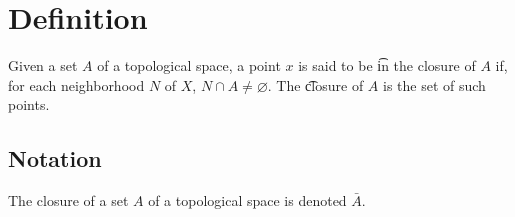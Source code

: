
\section*{Definition}

Given a set $A$ of a topological space, a point $x$ is said to be \t{in the closure of} $A$ if, for each neighborhood $N$ of $X$, $N \cap  A \neq \varnothing$.
The \t{closure} of $A$ is the set of such points.

\subsection*{Notation}

The closure of a set $A$ of a topological space is denoted $\bar{A}$.

\blankpage